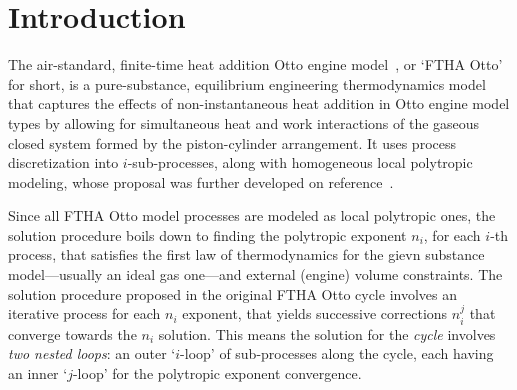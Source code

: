 \section{Introduction}

    The air-standard, finite-time heat addition Otto engine model~\cite{2017-NaaktgeborenC-IntJMechEngEduc}, or `FTHA Otto'  for
    short, is a pure-substance, equilibrium engineering thermodynamics model that captures the effects of non-instantaneous heat
    addition in Otto engine model types by allowing for simultaneous heat and work interactions of  the  gaseous  closed  system
    formed by the piston-cylinder arrangement. It uses process discretization into  $i$-sub-processes,  along  with  homogeneous
    local        polytropic        modeling,        whose        proposal        was        further         developed         on
    reference~\cite{2020-NaaktgeborenC-Polytropic-engrXiv-rev02}.

    Since all FTHA Otto model processes are modeled as local polytropic ones, the solution procedure boils down to  finding  the
    polytropic exponent $n_i$, for each $i$-th process, that satisfies the first law of thermodynamics for the  gievn  substance
    model---usually an ideal gas one---and external (engine) volume constraints. The solution procedure proposed in the original
    FTHA Otto cycle involves an iterative process for each $n_i$ exponent,  that  yields  successive  corrections  $n_i^j$  that
    converge towards the $n_i$ solution. This means the solution for the \emph{cycle} involves \emph{two nested loops}: an outer
    `$i$-loop' of sub-processes along the cycle, each having an inner `$j$-loop' for the polytropic exponent convergence.

    


